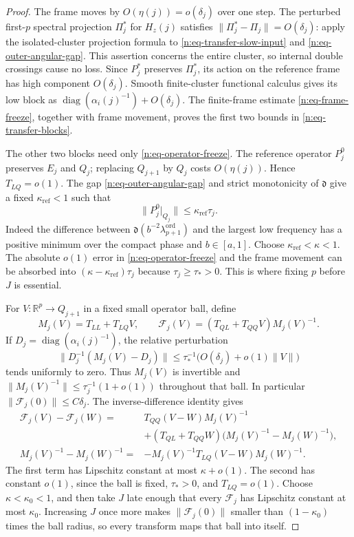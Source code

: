 \begin{proof}
The frame moves by \(O(\eta(j))=o(\delta_j)\) over one step.  The perturbed
first-\(p\) spectral projection \(\Pi_j^*\) for \(H_z(j)\) satisfies
\(\|\Pi_j^*-\Pi_j\|=O(\delta_j)\): apply the isolated-cluster projection
formula to \eqref{n:eq-transfer-slow-input} and
\eqref{n:eq-outer-angular-gap}.  This assertion concerns the entire cluster,
so internal double crossings cause no loss.  Since \(P_j^*\) preserves
\(\Pi_j^*\), its action on the reference frame has high component
\(O(\delta_j)\).  Smooth finite-cluster functional calculus gives its low
block as \(\operatorname{diag}(\alpha_i(j)^{-1})+O(\delta_j)\).
The finite-frame estimate \eqref{n:eq-frame-freeze}, together with frame
movement, proves the first two bounds in \eqref{n:eq-transfer-blocks}.

The other two blocks need only \eqref{n:eq-operator-freeze}.  The reference
operator \(P_j^0\) preserves \(E_j\) and \(Q_j\); replacing \(Q_{j+1}\)
by \(Q_j\) costs \(O(\eta(j))\).  Hence \(T_{LQ}=o(1)\).  The gap
\eqref{n:eq-outer-angular-gap} and strict monotonicity of \(\mathfrak d\)
give a fixed \(\kappa_{\mathrm{ref}}<1\) such that
\[
 \|P_j^0|_{Q_j}\|
 \leq \kappa_{\mathrm{ref}}\tau_j .
\]
Indeed the difference between
\(\mathfrak d(b^{-2}\lambda_{p+1}^{\mathrm{ord}})\) and the largest
low frequency has a positive minimum over the compact phase and
\(b\in[a,1]\).  Choose \(\kappa_{\mathrm{ref}}<\kappa<1\).
The absolute \(o(1)\) error in \eqref{n:eq-operator-freeze} and the frame
movement can be absorbed into \((\kappa-\kappa_{\mathrm{ref}})\tau_j\)
because \(\tau_j\geq\tau_*>0\).  This is where fixing \(p\) before \(J\)
is essential.

For \(V:\mathbb R^p\to Q_{j+1}\) in a fixed small operator ball, define
\[
 M_j(V)=T_{LL}+T_{LQ}V,\qquad
 \mathcal F_j(V)=(T_{QL}+T_{QQ}V)M_j(V)^{-1}.
\]
If \(D_j=\operatorname{diag}(\alpha_i(j)^{-1})\), the relative perturbation
\[
 \|D_j^{-1}(M_j(V)-D_j)\|
 \leq\tau_*^{-1}\bigl(O(\delta_j)+o(1)\|V\|\bigr)
\]
tends uniformly to zero.  Thus \(M_j(V)\) is invertible and
\(\|M_j(V)^{-1}\|\leq\tau_j^{-1}(1+o(1))\) throughout that ball.
In particular \(\|\mathcal F_j(0)\|\leq C\delta_j\).
The inverse-difference identity gives
\begin{align*}
 \mathcal F_j(V)-\mathcal F_j(W)
 ={}&T_{QQ}(V-W)M_j(V)^{-1}\\
 &+(T_{QL}+T_{QQ}W)
     \bigl(M_j(V)^{-1}-M_j(W)^{-1}\bigr),\\
 M_j(V)^{-1}-M_j(W)^{-1}
 ={}&-M_j(V)^{-1}T_{LQ}(V-W)M_j(W)^{-1}.
\end{align*}
The first term has Lipschitz constant at most \(\kappa+o(1)\).
The second has constant \(o(1)\), since the ball is fixed,
\(\tau_*>0\), and \(T_{LQ}=o(1)\).  Choose
\(\kappa<\kappa_0<1\), and then take \(J\) late enough that every
\(\mathcal F_j\) has Lipschitz constant at most \(\kappa_0\).
Increasing \(J\) once more makes
\(\|\mathcal F_j(0)\|\) smaller than \((1-\kappa_0)\) times the ball
radius, so every transform maps that ball into itself.


\end{proof}
